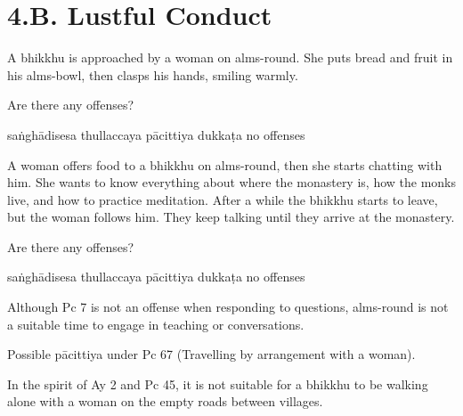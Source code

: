 \chapter{4.B. Lustful Conduct}
\renewcommand*{\theChapterTitle}{4.B. Lustful Conduct}

\begin{exam}{\autoExamName}

\begin{problem}
  A bhikkhu is approached by a woman on alms-round. She puts bread and fruit in
  his alms-bowl, then clasps his hands, smiling warmly.

  Are there any offenses?

  \begin{answers}{5}
    \bChoices
     saṅghādisesa\eAns
     thullaccaya\eAns
     pācittiya\eAns
     dukkaṭa\eAns
     no offenses\eAns
    \eChoices
  \end{answers}

\end{problem}

\problemDivide

\begin{problem}
  A woman offers food to a bhikkhu on alms-round, then she starts chatting with him.
  She wants to know everything about where the monastery is, how the monks live, and how to practice meditation.
  After a while the bhikkhu starts to leave, but the woman follows him.
  They keep talking until they arrive at the monastery.

  Are there any offenses?

  \begin{answers}{5}
    \bChoices
     saṅghādisesa\eAns
     thullaccaya\eAns
     pācittiya\eAns
     dukkaṭa\eAns
     no offenses\eAns
    \eChoices
  \end{answers}

  \begin{solution}
    Although Pc 7 is not an offense when responding to questions, alms-round is not a suitable time to engage in teaching or conversations.

    Possible pācittiya under Pc 67 (Travelling by arrangement with a woman).

    In the spirit of Ay 2 and Pc 45, it is not suitable for a bhikkhu to be walking alone with a woman on the empty roads between villages.
  \end{solution}

\end{problem}


\end{exam}
